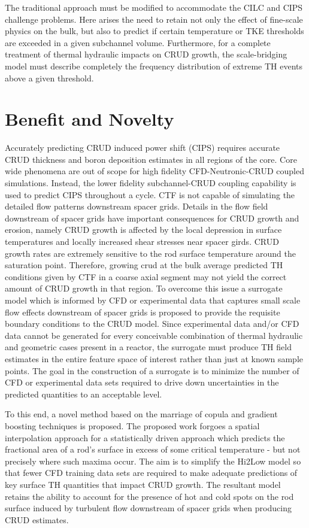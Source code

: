 The traditional approach must be modified to accommodate the CILC and CIPS
challenge problems.  Here arises the need to retain not only the effect of
fine-scale physics on the bulk, but also to predict if certain temperature or
TKE thresholds are exceeded in a given subchannel volume.  Furthermore, for a
complete treatment of thermal hydraulic impacts on CRUD growth, the
scale-bridging model must describe completely the frequency distribution of
extreme TH events above a given threshold.


\section{Benefit and Novelty}

Accurately predicting CRUD induced power shift (CIPS) requires accurate CRUD
thickness and boron deposition estimates in all regions of the core.  Core wide
phenomena are out of scope for high fidelity CFD-Neutronic-CRUD coupled
simulations.  Instead, the lower fidelity subchannel-CRUD coupling capability is used to
predict CIPS throughout a cycle.  CTF is not capable of simulating the detailed
flow patterns downstream spacer grids.  Details in the flow field
downstream of spacer grids have important consequences for CRUD growth and
erosion, namely CRUD growth is affected by the local depression in surface temperatures and locally
increased shear stresses near spacer girds.  CRUD growth rates are extremely sensitive to the rod surface
temperature around the saturation point.  Therefore, growing crud at the bulk
average predicted TH conditions given by CTF in a coarse axial segment may not
yield the correct amount of CRUD growth in that region.  To overcome this issue
a surrogate model which is informed by CFD or experimental data that captures
small scale flow effects downstream of spacer grids is proposed to provide the requisite
boundary conditions to the CRUD model.  Since experimental data and/or CFD data
cannot be generated for every conceivable combination of thermal hydraulic and
geometric cases present in a reactor, the surrogate must produce
TH field estimates in the entire feature space of interest rather than just at known
sample points.  The goal in the construction of a surrogate is to minimize the
number of CFD or experimental data sets required to drive down uncertainties in
the predicted quantities to an acceptable level.

To this end, a novel method based on the marriage of copula and gradient
boosting techniques is proposed.  The proposed work forgoes a spatial
interpolation approach for a statistically driven approach which predicts the
fractional area of a rod's surface in excess of some critical temperature - but
not precisely where such maxima occur.  The aim is to simplify the Hi2Low model
so that fewer CFD training data sets are required to make adequate predictions
of key surface TH quantities that impact CRUD growth.  The resultant model
retains the ability to account for the presence of hot and cold spots on the rod surface induced by
turbulent flow downstream of spacer grids when producing CRUD estimates.

